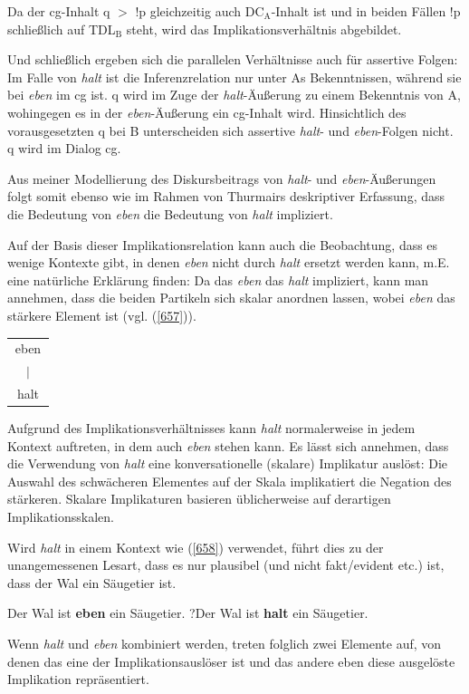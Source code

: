 Da der cg-Inhalt q $>$ !p gleichzeitig auch DC$_{\textrm{A}}$-Inhalt ist und in beiden Fällen !p schließlich auf TDL$_{\textrm{B}}$ steht, wird das Implikationsverhältnis abgebildet.
	
Und schließlich ergeben sich die parallelen Verhältnisse auch für assertive Folgen: Im Falle von \textit{halt} ist die Inferenzrelation nur unter As Bekenntnissen, während sie bei \textit{eben} im cg ist. q wird im Zuge der \textit{halt}-Äußerung zu einem Bekenntnis von A, wohingegen es in der \textit{eben}-Äußerung ein cg-Inhalt wird. Hinsichtlich des vorausgesetzten q bei B unterscheiden sich assertive \textit{halt}- und \textit{eben}-Folgen nicht. q wird im Dialog cg.

Aus meiner Modellierung des Diskursbeitrags von \textit{halt}- und \textit{eben}-Äußerungen folgt somit ebenso wie im Rahmen von Thurmairs deskriptiver Erfassung, dass die Bedeutung von \textit{eben} die Bedeutung von \textit{halt} impliziert. 

Auf der Basis dieser Implikationsrelation kann auch die Beobachtung, dass es wenige Kontexte gibt, in denen \textit{eben} nicht durch \textit{halt} ersetzt werden kann, m.E. eine natürliche Erklärung finden: Da das \textit{eben} das \textit{halt} impliziert, kann man annehmen, dass die beiden Partikeln sich skalar anordnen lassen, wobei \textit{eben} das stärkere Element ist (vgl. (\ref{657})).

\begin{exe}
        \ex\label{657} 
          \begin{tabular}[t]{ccc}
   		 \multicolumn{3}{c}{eben}\\
         & $\vert$ & \\
        \multicolumn{3}{c}{halt}
    	\end{tabular}
\end{exe}
Aufgrund des Implikationsverhältnisses kann \textit{halt} normalerweise in jedem Kontext auftreten, in dem auch \textit{eben} stehen kann. Es lässt sich annehmen, dass die Verwendung von \textit{halt} eine konversationelle (skalare) Implikatur  auslöst: Die Auswahl des schwächeren Elementes auf der Skala implikatiert die Negation des stärkeren. Skalare Implikaturen basieren üblicherweise auf derartigen Implikationsskalen.

Wird \textit{halt} in einem Kontext wie (\ref{658}) verwendet, führt dies zu der unangemessenen Lesart, dass es nur plausibel (und nicht fakt/evident etc.) ist, dass der Wal ein Säugetier ist.
\pagebreak
\begin{exe}
	\ex\label{658} 
		\begin{xlist}	
			\ex\label{658a} Der Wal ist \textbf{eben} ein Säugetier.
			\ex\label{658b} ?Der Wal ist \textbf{halt} ein Säugetier.
		\end{xlist}
\end{exe}
Wenn \textit{halt} und \textit{eben} kombiniert werden, treten folglich zwei Elemente auf, von denen das eine der Implikationsauslöser ist und das andere eben diese ausgelöste Implikation repräsentiert.

